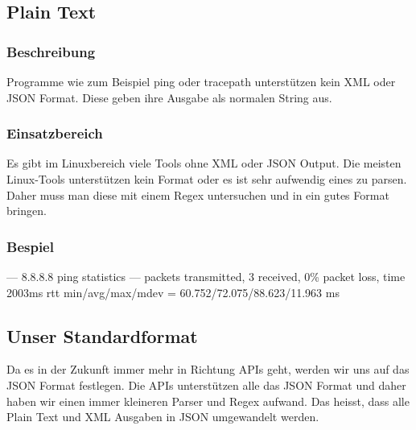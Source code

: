 \documentclass[a4,12pt]{scrartcl}
\begin{document}
\subsection{Plain Text}
\subsubsection{Beschreibung}
Programme wie zum Beispiel ping oder tracepath unterstützen kein XML oder JSON Format. Diese geben ihre Ausgabe als normalen String aus. 
\subsubsection{Einsatzbereich}
Es gibt im Linuxbereich viele Tools ohne XML oder JSON Output. Die meisten Linux-Tools unterstützen kein Format oder es ist sehr aufwendig eines zu parsen. Daher muss man diese mit einem Regex untersuchen und in ein gutes Format bringen.
\subsubsection{Bespiel}
--- 8.8.8.8 ping statistics --- packets transmitted, 3 received, 0\% packet loss, time 2003ms\newline
rtt min/avg/max/mdev = 60.752/72.075/88.623/11.963 ms\newline

\subsection{Unser Standardformat}
Da es in der Zukunft immer mehr in Richtung APIs geht, werden wir uns auf das JSON Format festlegen. Die APIs unterstützen alle das JSON Format und daher haben wir einen immer kleineren Parser und Regex aufwand. Das heisst, dass alle Plain Text und XML Ausgaben in JSON umgewandelt werden.
\end{document}
